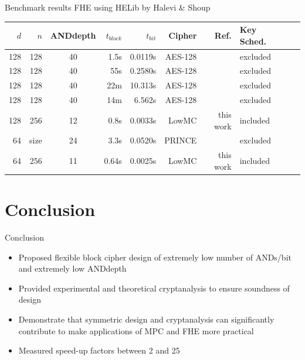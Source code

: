 \documentclass[10pt,compress]{beamer}
\begin{document}
\begin{frame}{Benchmark results FHE using HELib by Halevi \& Shoup}
\centering
\begin{table}
\scriptsize
\centering
\begin{tabular}{rrc@{\hskip 1em}r@{\hskip 1em}r@{\hskip 1em}r@{\hskip 1em}r@{\hskip 1em}l@{\hskip 1em}l@{\hskip 1em}l}
\toprule
  $d$  & $n$ & ANDdepth & $t_{block}$ & $t_{bit}$ & Cipher & Ref. & Key Sched.\\
\midrule
 128 & 128 & 40 &  1.5s & 0.0119s & AES-128 & \cite{cryptoeprint:2012:099} & excluded\\
 128 & 128 & 40 &   55s & 0.2580s & AES-128 & \cite{cryptoeprint:2014:039} & excluded\\
 128 & 128 & 40 &   22m & 10.313s & AES-128 & \cite{mella-susella:ima2013} & excluded\\
 128 & 128 & 40 &   14m &  6.562s & AES-128 & \cite{mella-susella:ima2013} & excluded\\
 128 & 256 & 12 &  0.8s & 0.0033s & LowMC   & this work & included\\
\midrule
  64 & size & 24 &  3.3s & 0.0520s & PRINCE  & \cite{cryptoeprint:2014:233} & excluded\\
  64 & 256 & 11 & 0.64s & 0.0025s & LowMC   & this work & included\\  
\midrule
\end{tabular}
\end{table}
\end{frame}

\section{Conclusion}

\begin{frame}{Conclusion}
\begin{itemize}
  \item Proposed \alert{flexible block cipher} design of \alert{extremely low}
        number of \alert{ANDs/bit} and \alert{extremely low ANDdepth}
  \item Provided experimental and theoretical cryptanalysis to ensure
        soundness of design
  \item Demonstrate that symmetric design and cryptanalysis can significantly contribute
        to make applications of MPC and FHE more practical
  \item Measured \alert{speed-up} factors between 2 and 25
\end{itemize}
\end{frame}
\end{document}
